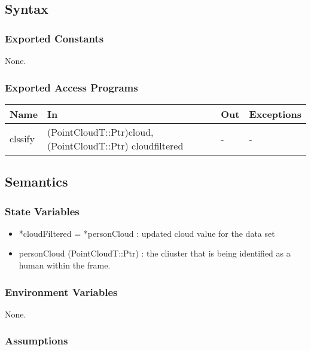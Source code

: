 \documentclass[12pt, titlepage]{article}
\begin{document}
\subsection{Syntax}

\subsubsection{Exported Constants}

None.

\subsubsection{Exported Access Programs}

\begin{center}
\begin{tabular}{p{2cm} p{4cm} p{4cm} p{2cm}}
\hline
\textbf{Name} & \textbf{In} & \textbf{Out} & \textbf{Exceptions} \\
\hline
clssify & (PointCloudT::Ptr)cloud, (PointCloudT::Ptr) cloudfiltered & - & - \\
\hline
\end{tabular}
\end{center}

\subsection{Semantics}

\subsubsection{State Variables}

\begin{itemize}
  \item *cloudFiltered = *personCloud : updated cloud value for the data set
  \item personCloud (PointCloudT::Ptr) : the cliuster that is being identified as a human within the frame.
\end{itemize}

\subsubsection{Environment Variables}

None.

\subsubsection{Assumptions}
\end{document}

